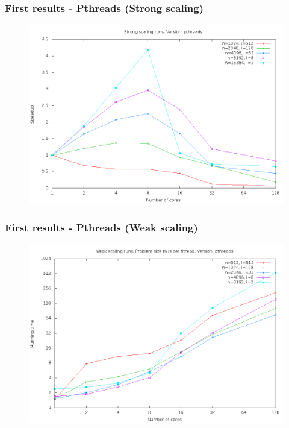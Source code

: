 \documentclass{beamer}
\begin{document}
\begin{frame}
\frametitle{First results - Pthreads (Strong scaling)}
\begin{figure}
\includegraphics[width=\textwidth]{gfx/padding_strong_scaling_pthreads_speedup}
\end{figure}
\end{frame}

\begin{frame}
\frametitle{First results - Pthreads (Weak scaling)}
\begin{figure}
\includegraphics[width=\textwidth]{gfx/padding_weak_scaling_pthreads_runningtime}
\end{figure}
\end{frame}
\end{document}
